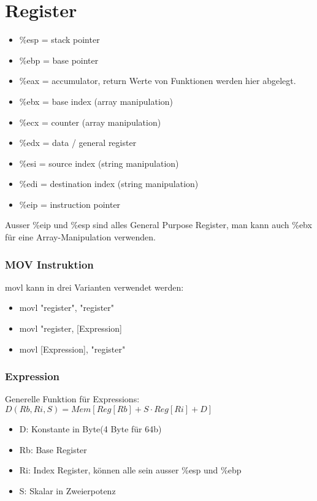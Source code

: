 \documentclass[a4paper, 11pt]{article}
\begin{document}
\section{Register}
\begin{itemize}
	\item \%esp = stack pointer
	\item \%ebp = base pointer
	\item \%eax = accumulator, return Werte von Funktionen werden hier abgelegt.
	\item \%ebx = base index (array manipulation)
	\item \%ecx = counter (array manipulation)
	\item \%edx = data / general register
	\item \%esi = source index (string manipulation)
	\item \%edi = destination index (string manipulation)
	\item \%eip = instruction pointer
\end{itemize}
Ausser \%eip und \%esp sind alles General Purpose Register, man kann auch \%ebx für eine Array-Manipulation verwenden.

\subsubsection{MOV Instruktion}
movl kann in drei Varianten verwendet werden:
\begin{itemize}
	\item movl "register", "register"
	\item movl "register, [Expression]
	\item movl [Expression], "register"
\end{itemize}

\subsubsection{Expression}
Generelle Funktion für Expressions: $D(Rb,Ri,S)= Mem[Reg[Rb]+S \cdot Reg[Ri]+D]$\\
\begin{itemize}
	\item D: Konstante in Byte(4 Byte für 64b)
	\item Rb: Base Register
	\item Ri: Index Register, können alle sein ausser \%esp und \%ebp
	\item S: Skalar in Zweierpotenz
\end{itemize}
\end{document}

